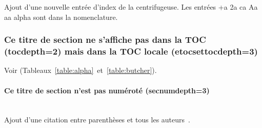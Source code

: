 		Ajout d'une nouvelle entrée d'index de la centrifugeuse. Les entrées \gls{+a} \gls{2a} \gls{ca} \gls{Aa} \gls{aa} \gls{alpha} {\NoAutoSpaceBeforeFDP}sont dans la nomenclature.

		\subsubsection{Ce titre de section ne s'affiche pas dans la TOC (tocdepth=2) mais dans la TOC locale (etocsettocdepth=3)}

			Voir (Tableaux~\ref{table:alpha}~et~\ref{table:butcher}).

			\paragraph{Ce titre de section n'est pas numéroté (secnumdepth=3)}~~\\ %

				Ajout d'une citation entre parenthèses et tous les auteurs~\parencite{zohdy_mapping_2012}.
